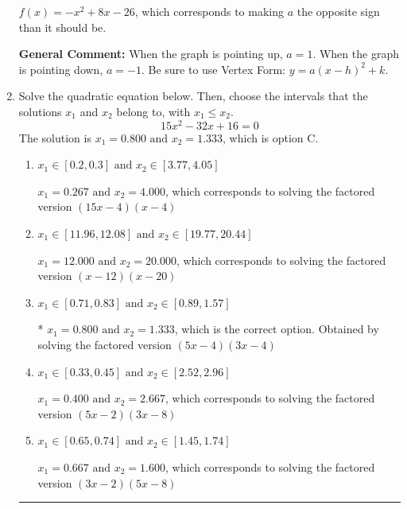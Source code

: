 \documentclass{extbook}[14pt]
\newcommand{\litem}[1]{\item #1

\rule{\textwidth}{0.4pt}}
\begin{document}
\begin{enumerate}
{\begin{enumerate}[label=\Alph*.]
$f(x)=-x^{2} +8 x -26$, which corresponds to making $a$ the opposite sign than it should be.
\end{enumerate}

\textbf{General Comment:} When the graph is pointing up, $a=1$. When the graph is pointing down, $a=-1$. Be sure to use Vertex Form: $y = a(x-h)^2+k$.
}
\litem{
Solve the quadratic equation below. Then, choose the intervals that the solutions $x_1$ and $x_2$ belong to, with $x_1 \leq x_2$.
\[ 15x^{2} -32 x + 16 = 0 \]
The solution is \( x_1 = 0.800 \text{ and } x_2 = 1.333 \), which is option C.\begin{enumerate}[label=\Alph*.]
\item \( x_1 \in [0.2, 0.3] \text{ and } x_2 \in [3.77, 4.05] \)

$x_1 = 0.267 \text{ and } x_2 = 4.000$, which corresponds to solving the factored version $(15x -4)(x -4)$
\item \( x_1 \in [11.96, 12.08] \text{ and } x_2 \in [19.77, 20.44] \)

$x_1 = 12.000 \text{ and } x_2 = 20.000$, which corresponds to solving the factored version $(x -12)(x -20)$
\item \( x_1 \in [0.71, 0.83] \text{ and } x_2 \in [0.89, 1.57] \)

* $x_1 = 0.800 \text{ and } x_2 = 1.333$, which is the correct option. Obtained by solving the factored version $(5x -4)(3x -4)$
\item \( x_1 \in [0.33, 0.45] \text{ and } x_2 \in [2.52, 2.96] \)

$x_1 = 0.400 \text{ and } x_2 = 2.667$, which corresponds to solving the factored version $(5x -2)(3x -8)$
\item \( x_1 \in [0.65, 0.74] \text{ and } x_2 \in [1.45, 1.74] \)

$x_1 = 0.667 \text{ and } x_2 = 1.600$, which corresponds to solving the factored version $(3x -2)(5x -8)$
\end{enumerate}

}
\end{enumerate}
\end{document}
